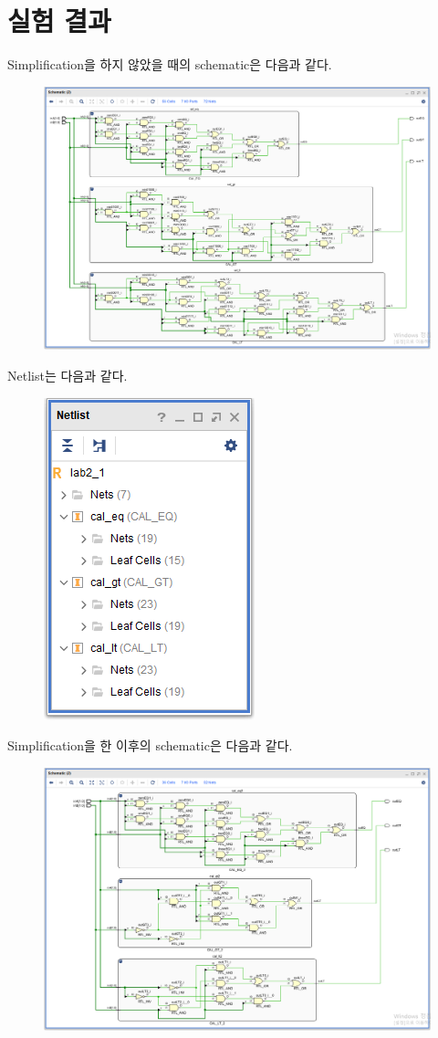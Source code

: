 \documentclass{scrartcl}
\begin{document}
\section{실험 결과}
Simplification을 하지 않았을 때의 schematic은 다음과 같다.
\begin{figure}[H]
  \centering
  \includegraphics[width=\linewidth]{lab2_1_schematic}
\end{figure}
Netlist는 다음과 같다.
\begin{figure}[H]
  \centering
  \includegraphics[width=0.4\linewidth]{lab2_1_netlist}
\end{figure}
Simplification을 한 이후의 schematic은 다음과 같다.
\begin{figure}[H]
  \centering
  \includegraphics[width=\linewidth]{lab2_2_schematic}
\end{figure}
\end{document}
